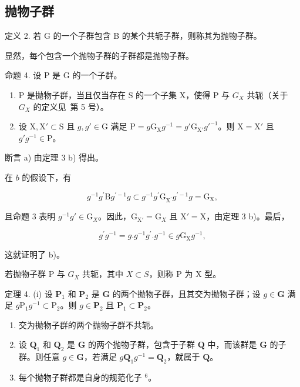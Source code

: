 \subsection{抛物子群}

定义 2. 若 G 的一个子群包含 B 的某个共轭子群，则称其为抛物子群。

显然，每个包含一个抛物子群的子群都是抛物子群。

命题 4. 设 P 是 G 的一个子群。

\begin{enumerate}
\def\labelenumi{\alph{enumi})}
\item
  P 是抛物子群，当且仅当存在 S 的一个子集 X，使得 P 与 \(G_{X}\) 共轭（关于 \(G_{X}\) 的定义见~第 5 号）。
\item
  设 \(\mathrm{X}, \mathrm{X}' \subset \mathrm{S}\) 且 \(g, g' \in \mathrm{G}\) 满足 \(\mathrm{P} = g\mathrm{G}_{\mathrm{X}}g^{-1} = g'\mathrm{G}_{\mathrm{X}'}g'^{-1}\)。则 \(\mathrm{X} = \mathrm{X}'\) 且 \(g'g^{-1} \in \mathrm{P}\)。
\end{enumerate}

断言 a) 由定理 3 b) 得出。

在 \(b\) 的假设下，有

\[
g ^ {- 1} g ^ {\prime} \mathrm{B} g ^ {\prime - 1} g \subset g ^ {- 1} g ^ {\prime} \mathrm{G} _ {\mathrm{X} ^ {\prime}} g ^ {\prime - 1} g = \mathrm{G} _ {\mathrm{X}},
\]

且命题 3 表明 \(g^{-1}g' \in \mathrm{G}_X\)。因此，\(\mathrm{G}_{\mathrm{X}'} = \mathrm{G}_X\) 且 \(\mathrm{X}' = \mathrm{X}\)，由定理 3 b)。最后，

\[
g ^ {\prime} g ^ {- 1} = g. g ^ {- 1} g ^ {\prime}. g ^ {- 1} \in g \mathrm{G} _ {\mathrm{X}} g ^ {- 1},
\]

这就证明了 b)。

若抛物子群 P 与 \(G_{X}\) 共轭，其中 \(X \subset S\)，则称 P 为 X 型。

定理 4. (i) 设 \(\mathbf{P}_1\) 和 \(\mathbf{P}_2\) 是 \(\mathbf{G}\) 的两个抛物子群，且其交为抛物子群；设 \(g \in \mathbf{G}\) 满足 \(g\mathrm{P}_1g^{-1} \subset \mathrm{P}_2\)。则 \(g \in \mathbf{P}_2\) 且 \(\mathbf{P}_1 \subset \mathbf{P}_2\)。

\begin{enumerate}
\def\labelenumi{(\roman{enumi})}
\setcounter{enumi}{1}
\item
  交为抛物子群的两个抛物子群不共轭。
\item
  设 \(\mathbf{Q}_1\) 和 \(\mathbf{Q}_2\) 是 \(\mathbf{G}\) 的两个抛物子群，包含于子群 \(\mathbf{Q}\) 中，而该群是 \(\mathbf{G}\) 的子群。则任意 \(g \in \mathbf{G}\)，若满足 \(g\mathbf{Q}_1g^{-1} = \mathbf{Q}_2\)，就属于 \(\mathbf{Q}\)。
\item
  每个抛物子群都是自身的规范化子 \(^{6}\)。
\end{enumerate}


